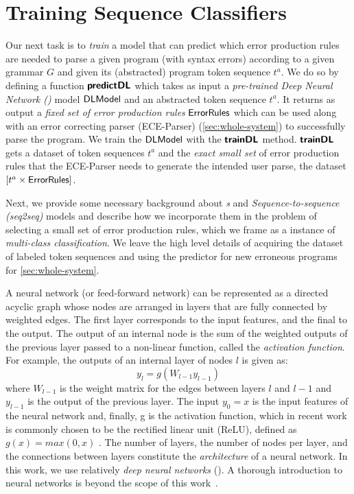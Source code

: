 \section{Training Sequence Classifiers}
\label{sec:seq-classifiers}

Our next task is to \emph{train} a model that can predict which error production
rules are needed to parse a given program (with syntax errors) according to a
given grammar $G$ and given its (abstracted) program token sequence $t^a$.
%
We do so by defining a function $\bm{\mathsf{predictDL}}$ which takes as input a
\emph{pre-trained Deep Neural Network (\dnn)} model $\mathsf{DLModel}$ and an abstracted
token sequence $t^a$.
%
It returns as output a \emph{fixed set of error production rules}
$\mathsf{ErrorRules}$ which can be used along with an error correcting parser
(ECE-Parser) (\autoref{sec:whole-system}) to successfully parse the program.
%
We train the $\mathsf{DLModel}$ with the $\bm{\mathsf{trainDL}}$ method. $\bm{\mathsf{trainDL}}$ gets a
dataset of token sequences $t^a$ and the \emph{exact small set} of error
production rules that the ECE-Parser needs to generate the intended user parse,
\ie the dataset $[t^a \times \mathsf{ErrorRules}]$.

Next, we provide some necessary background about \emph{\dnn{}s} and
\emph{Sequence-to-sequence (seq2seq)} models and describe how we incorporate
them in the problem of selecting a small set of error production rules, which we
frame as a instance of \emph{multi-class classification}. We leave the high
level details of acquiring the dataset of labeled token sequences and using the
predictor for new erroneous programs for \autoref{sec:whole-system}.

A neural network (or feed-forward network) can be represented as a directed
acyclic graph whose nodes are arranged in layers that are fully connected by
weighted edges. The first layer corresponds to the input features, and the final
to the output. The output of an internal node is the sum of the weighted outputs
of the previous layer passed to a non-linear function, called the
\emph{activation function}. For example, the outputs of an internal layer of
nodes $l$ is given as:
\begin{equation*}
    y_l = g(W_{l-1} y_{l-1})
\end{equation*}
where $W_{l-1}$ is the weight matrix for the edges between layers $l$ and $l-1$
and $y_{l-1}$ is the output of the previous layer. The input $y_0 = x$ is the
input features of the neural network and, finally, g is the activation function,
which in recent work is commonly chosen to be the rectified linear unit (ReLU),
defined as $g(x) = max(0, x)$ \citep{Nair2010-xg}.  The number of layers, the
number of nodes per layer, and the connections between layers constitute the
\emph{architecture} of a neural network. In this work, we use relatively
\emph{deep neural networks} (\dnn). A thorough introduction to neural networks
is beyond the scope of this work~\citep{Hastie2009-bn, Nielsen2015-pu}.


